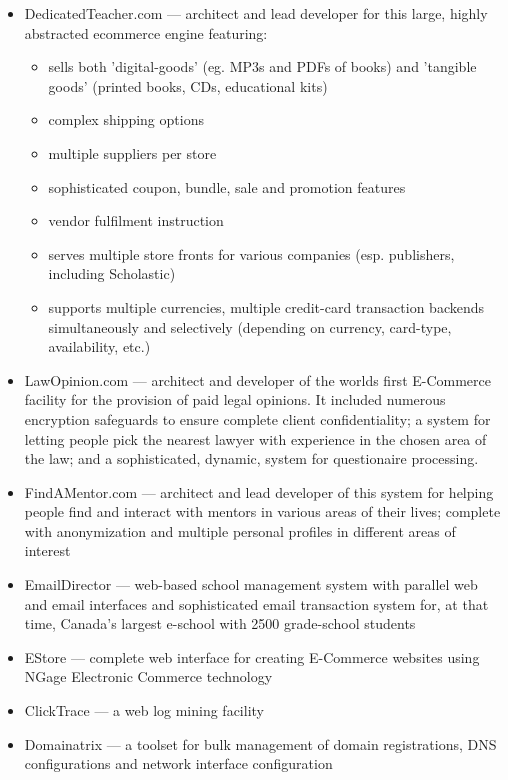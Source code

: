 \begin{resume}
\begin{position}
\begin{itemize}
\item DedicatedTeacher.com --- architect and lead developer
  for this large, highly abstracted ecommerce engine featuring:
    \begin{itemize}
      \item sells both 'digital-goods' (eg. MP3s and PDFs of books)
      and 'tangible goods' (printed books, CDs, educational kits)
      \item complex shipping options
      \item multiple suppliers per store
      \item sophisticated coupon, bundle, sale and promotion features
      \item vendor fulfilment instruction
      \item serves multiple store fronts for various companies
      (esp. publishers, including Scholastic)
      \item supports multiple currencies, multiple credit-card
      transaction backends simultaneously and selectively 
      (depending on currency, card-type, availability, etc.)
    \end{itemize}

\item LawOpinion.com --- architect and developer of the worlds
                        first E-Commerce facility for the provision of 
                        paid legal opinions.  
                        It included numerous encryption safeguards 
                        to ensure complete client confidentiality; a
                        system for letting people pick the nearest
                        lawyer with experience in the chosen area of
                        the law;  and a sophisticated, dynamic,
                        system for questionaire processing.

\item FindAMentor.com --- architect and lead developer of this system
                    for helping people find and interact with mentors in
		    various areas of their lives; complete with anonymization and
		    multiple personal profiles in different areas of interest
\item EmailDirector --- web-based school management system with
                        parallel web and email interfaces
                        and sophisticated email transaction system for,
                        at that time, Canada's largest e-school
                        with 2500 grade-school students
\item EStore --- complete web interface for creating E-Commerce
                 websites using NGage Electronic Commerce technology
\item ClickTrace --- a web log mining facility
\item Domainatrix --- a toolset for bulk management of domain registrations, 
                      DNS configurations and network interface
                      configuration
\end{itemize}


\end{position}
\end{resume}
